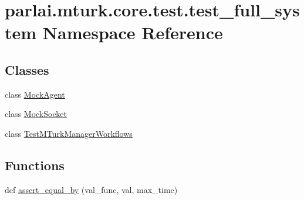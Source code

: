 \hypertarget{namespaceparlai_1_1mturk_1_1core_1_1test_1_1test__full__system}{}\section{parlai.\+mturk.\+core.\+test.\+test\+\_\+full\+\_\+system Namespace Reference}
\label{namespaceparlai_1_1mturk_1_1core_1_1test_1_1test__full__system}
\subsection*{Classes}
\begin{DoxyCompactItemize}
\item 
class \hyperlink{classparlai_1_1mturk_1_1core_1_1test_1_1test__full__system_1_1MockAgent}{Mock\+Agent}
\item 
class \hyperlink{classparlai_1_1mturk_1_1core_1_1test_1_1test__full__system_1_1MockSocket}{Mock\+Socket}
\item 
class \hyperlink{classparlai_1_1mturk_1_1core_1_1test_1_1test__full__system_1_1TestMTurkManagerWorkflows}{Test\+M\+Turk\+Manager\+Workflows}
\end{DoxyCompactItemize}
\subsection*{Functions}
\begin{DoxyCompactItemize}
\item 
def \hyperlink{namespaceparlai_1_1mturk_1_1core_1_1test_1_1test__full__system_a0b463246d35658a2e422010f13dcf819}{assert\+\_\+equal\+\_\+by} (val\+\_\+func, val, max\+\_\+time)
\end{DoxyCompactItemize}
